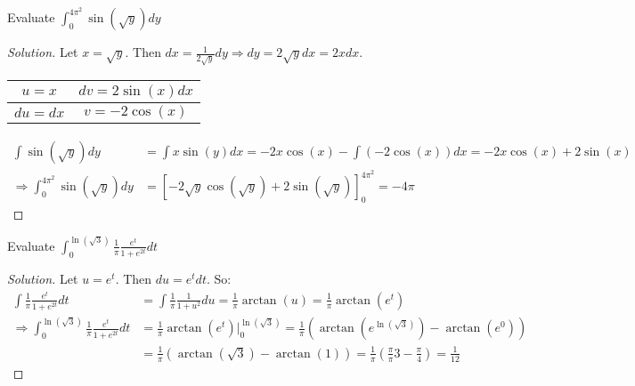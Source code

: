 \documentclass[crop=false,class=article,oneside]{standalone}
\begin{document}
        \begin{problem}
        Evaluate $\int_{0}^{4\pi^{2}}\sin(\sqrt{y})dy$
        \end{problem}
        \begin{proof}[Solution]
        Let $x=\sqrt{y}$. Then $dx=\frac{1}{2\sqrt{y}}dy\Rightarrow dy=2\sqrt{y}dx=2xdx$.
        \begin{table}[H]
            \centering
            \begin{tabular}{|c|c|}
                \hline
                $u=x$&$dv=2\sin(x)dx$\\
                \hline
                $du=dx$&$v=-2\cos(x)$\\
                \hline
            \end{tabular}
        \end{table}
        \begin{align*}
            \int\sin(\sqrt{y})dy&=\int x\sin(y)dx=-2x\cos(x)-\int(-2\cos(x))dx=-2x\cos(x)+2\sin(x)\\
            \Rightarrow \int_{0}^{4\pi^{2}}\sin(\sqrt{y})dy&=[-2\sqrt{y}\cos(\sqrt{y})+2\sin(\sqrt{y})]_{0}^{4\pi^{2}}=-4\pi
        \end{align*}
        \end{proof}
        \begin{problem}
        Evaluate $\int_{0}^{\ln(\sqrt{3})}\frac{1}{\pi}\frac{e^{t}}{1+e^{2t}}dt$
        \end{problem}
        \begin{proof}[Solution]
        Let $u=e^{t}$. Then $du=e^{t}dt$. So:
        \begin{align*}
            \int\frac{1}{\pi}\frac{e^{t}}{1+e^{2t}}dt&=\int\frac{1}{\pi}\frac{1}{1+u^{2}}du=\frac{1}{\pi}\arctan(u)=\frac{1}{\pi}\arctan(e^{t})\\
            \Rightarrow\int_{0}^{\ln(\sqrt{3})}\frac{1}{\pi}\frac{e^{t}}{1+e^{2t}}dt&=\frac{1}{\pi}\arctan(e^{t})\big|_{0}^{\ln(\sqrt{3})}=\frac{1}{\pi}(\arctan(e^{\ln(\sqrt{3})})-\arctan(e^{0}))\\
            &=\frac{1}{\pi}(\arctan(\sqrt{3})-\arctan(1))=\frac{1}{\pi}(\frac{\pi}{\pi}{3}-\frac{\pi}{4})=\frac{1}{12}
        \end{align*}
        \end{proof}
        \newpage
\end{document}
